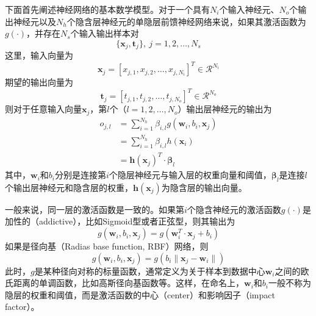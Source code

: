 下面首先阐述神经网络的基本数学模型。对于一个具有$N_{i}$个输入神经元、$N_{o}$个输出神经元以及$N_{h}$个隐含层神经元的单隐层前馈神经网络来说，如果其激活函数为$g(\cdot)$，并存在$N_{s}$个输入输出样本对
$$\{\bm{x}_{j},\bm{t}_{j}\},\ j=1,2,\ldots,N_{s}$$
这里，输入向量为
$$\bm{x}_{j}=[x_{j,1},x_{j,2},\ldots,x_{j,N_{i}}]^{T}\in \mathcal{R}^{N_{i}}$$
期望的输出向量为
$$\bm{t}_{j}=[t_{j,1},t_{j,2},\ldots,t_{j,N_{o}}]^{T}\in \mathcal{R}^{N_{o}}$$
则对于任意输入向量$\bm{x}_{j}$，第$l$个（$l=1,2,\dots,N_{o}$）输出层神经元的输出为
\begin{equation}%
\label{eq:4.slfn.o}
\begin{split}%
o_{j,l}&=\sum_{i=1}^{N_{h}} \beta_{i,l} g(\bm{w}_{i},b_{i},\bm{x}_{j})\\
&=\sum_{i=1}^{N_{h}} \beta_{i,l} h(\bm{x}_{i})\\
&=\bm{h}(\bm{x}_{j})^{T}\cdot\bm{\beta}_{l}
\end{split}
\end{equation}
其中，$\bm{w}_{i}$和$b_{i}$分别是连接第$i$个隐层神经元与输入层的权重向量和阈值，$\bm{\beta}_{l}$是连接$l$个输出层神经元和隐含层的权重，$\bm{h}(\bm{x}_{j})$为隐含层的输出向量。

一般来说，同一层的激活函数是一致的。如果第$i$个隐含神经元的激活函数$g(\cdot)$是加性的（addictive），比如Sigmoid型或者正弦型，则其输出为
\begin{equation}%
g(\bm{w}_{i},b_{i},\bm{x}_{j})=g(\bm{w}_{i}^{T}\cdot\bm{x}_{j}+b_{i})
\end{equation}
如果是径向基（Radias base function, RBF）网络，则
\begin{equation}%
g(\bm{w}_{i},b_{i},\bm{x}_{j})=g(b_{i}\|\bm{x}_{j}-\bm{w}_{i}\|)
\end{equation}
此时，$g$是某种径向对称的标量函数，通常定义为关于样本到数据中心$\bm{w}_{i}$之间的欧氏距离的单调函数，比如高斯径向基函数等。这样，在命名上，$\bm{w}_{i}$和$b_{i}$一般不称为隐层的权重和阈值，而是激活函数的中心（center）和影响因子（impact factor）。


